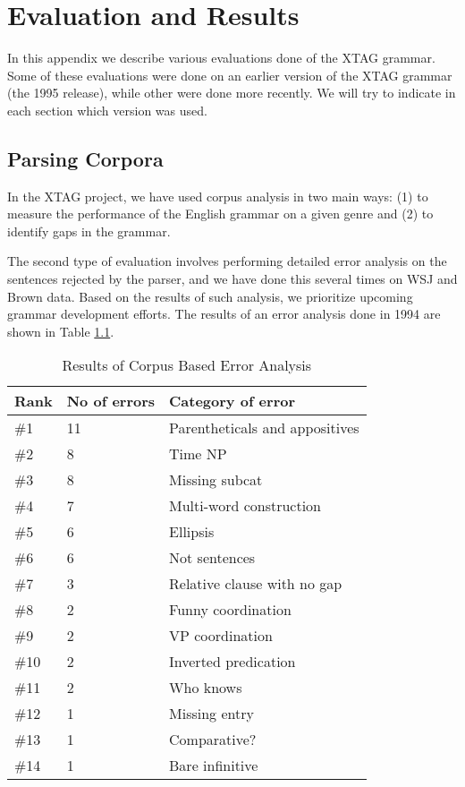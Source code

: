 \chapter{Evaluation and Results}
\label{evaluation}

In this appendix we describe various evaluations done of the XTAG
grammar. Some of these evaluations were done on an earlier version of
the XTAG grammar (the 1995 release), while other were done more
recently. We will try to indicate in each section which version was
used. 

\section{Parsing Corpora}

In the XTAG project, we have used corpus analysis in two main ways:
(1) to measure the performance of the English grammar on a given genre
and (2) to identify gaps in the grammar. 

The second type of evaluation involves performing detailed error
analysis on the sentences rejected by the parser, and we have done
this several times on WSJ and Brown data.
Based on the results of such analysis, we prioritize upcoming grammar
development efforts. The results of an error analysis done in 1994
\cite{xtag-notes} are shown in Table \ref{errors94}.  

\begin{table}[htb]
\centering
\begin{tabular}{|l|l|l|} \hline
Rank & No of errors & Category of error \\ \hline
\#1  & 11  &    Parentheticals and appositives \\ \hline
\#2  & 8     &  Time NP \\ \hline
\#3  & 8  &     Missing subcat \\ \hline
\#4  & 7 &      Multi-word construction \\ \hline
\#5  & 6 &       Ellipsis \\ \hline
\#6  & 6  &      Not sentences \\ \hline
\#7  & 3  &      Relative clause with no gap \\ \hline
\#8  & 2  &      Funny coordination \\ \hline
\#9  & 2  &      VP coordination \\ \hline
\#10  & 2  &      Inverted predication \\ \hline
\#11  & 2  &      Who knows \\ \hline
\#12  & 1  &      Missing entry \\ \hline
\#13  & 1   &     Comparative? \\ \hline
\#14  & 1    &    Bare infinitive \\ \hline
\end{tabular}
\caption{Results of Corpus Based Error Analysis}
\label{errors94}
\end{table}

